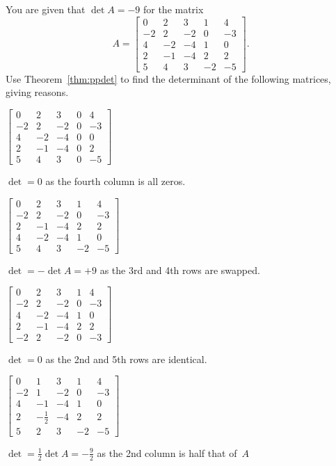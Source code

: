 \begin{example} \label{eg:}
You are given that \(\det A=-9\) for the matrix
\begin{equation*}
A=\begin{bmatrix}0&2&3&1&4
\\-2&2&-2&0&-3
\\4&-2&-4&1&0
\\2&-1&-4&2&2
\\5&4&3&-2&-5\end{bmatrix}.
\end{equation*}
Use Theorem~\ref{thm:ppdet} to find the determinant of the following matrices, giving reasons. 
\begin{parts}
\item \(\begin{bmatrix}0&2&3&0&4
\\-2&2&-2&0&-3
\\4&-2&-4&0&0
\\2&-1&-4&0&2
\\5&4&3&0&-5\end{bmatrix}\)
\begin{solution} 
\(\det=0\) as the fourth column is all zeros. 
\end{solution}

\item \(\begin{bmatrix}0&2&3&1&4
\\-2&2&-2&0&-3
\\2&-1&-4&2&2
\\4&-2&-4&1&0
\\5&4&3&-2&-5\end{bmatrix}\)
\begin{solution} 
\(\det=-\det A=+9\) as the 3rd and 4th rows are swapped. 
\end{solution}

\item \(\begin{bmatrix}0&2&3&1&4
\\-2&2&-2&0&-3
\\4&-2&-4&1&0
\\2&-1&-4&2&2
\\-2&2&-2&0&-3\end{bmatrix}\)
\begin{solution} 
\(\det=0\) as the 2nd and 5th rows are identical. 
\end{solution}

\item \(\begin{bmatrix}0&1&3&1&4
\\-2&1&-2&0&-3
\\4&-1&-4&1&0
\\2&-\frac12&-4&2&2
\\5&2&3&-2&-5\end{bmatrix}\)
\begin{solution} 
\(\det=\frac12\det A=-\frac92\) as the 2nd column is half that of~\(A\) 
\end{solution}


\end{parts}
\end{example}

